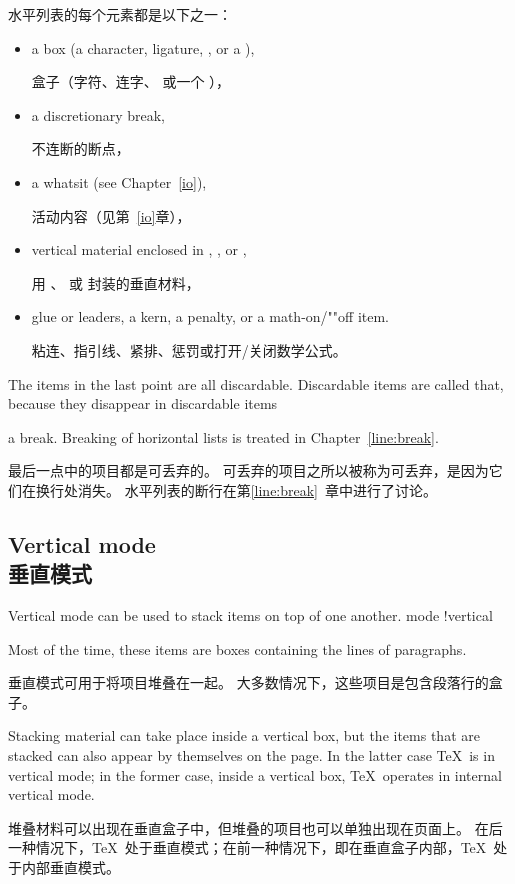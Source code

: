 水平列表的每个元素都是以下之一：
\begin{itemize} \item a box (a character, ligature, ,
or a ),

盒子（字符、连字、 或一个 ），
\item a discretionary break,

不连断的断点，
\item a whatsit (see Chapter~\ref{io}),

活动内容（见第~\ref{io}章），
\item vertical material enclosed in ,
, or ,

用 、 或  封装的垂直材料，
\item 
\mdqon
glue or leaders, a kern, a penalty, or a math-on/""off item.

粘连、指引线、紧排、惩罚或打开/关闭数学公式。
\mdqoff
\end{itemize}
The items in the last point are all discardable.
Discardable items are called that, because they disappear in
\term discardable items\par
a break. Breaking of horizontal
lists is treated in Chapter~\ref{line:break}.

最后一点中的项目都是可丢弃的。
可丢弃的项目之所以被称为可丢弃，是因为它们在换行处消失。
水平列表的断行在第\ref{line:break}~章中进行了讨论。



\subsection{Vertical mode\\垂直模式}

Vertical mode can be used to stack items on top of one another.
\term mode !vertical\par
Most of the time, these items are boxes 
containing the lines of paragraphs.

垂直模式可用于将项目堆叠在一起。
大多数情况下，这些项目是包含段落行的盒子。

Stacking material can take place inside a 
vertical box, but the
items that are stacked can also 
appear by themselves on the page. In the latter case
\TeX\ is in vertical mode; in the former case, inside a
vertical box, \TeX\ operates in internal vertical mode.

堆叠材料可以出现在垂直盒子中，但堆叠的项目也可以单独出现在页面上。
在后一种情况下，\TeX\ 处于垂直模式；在前一种情况下，即在垂直盒子内部，\TeX\ 处于内部垂直模式。

